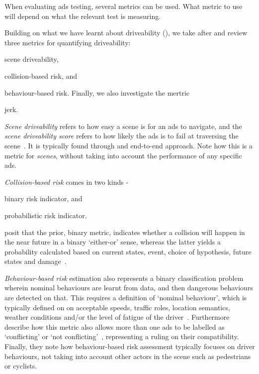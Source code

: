 When evaluating \acrshort{ads} testing, several metrics can be used. What metric to use will depend
on what the relevant test is measuring.

Building on what we have learnt about driveability (),
we take after \citeauthor{safeToDrive} and review three metrics for
quantifying driveability: \begin{inparaenum}
    \item scene driveability,
    \item collision-based risk, and
    \item behaviour-based risk. Finally, we also investigate the mertric
    \item jerk.
\end{inparaenum}

\emph{Scene driveability} refers to how easy a scene is for an
\acrshort{ads} to navigate, and the \textit{scene driveability score} refers to
how likely the \acrlong{ads} is to fail at traversing the
scene~\cite[3140]{safeToDrive}. It is typically found through and end-to-end
approach. Note how this is a metric for \textit{scenes}, without taking into
account the performance of any specific \acrshort{ads}.

\emph{Collision-based risk} comes in two kinds - \begin{inparaenum}
    \item binary risk indicator, and
    \item probabilistic risk indicator.
\end{inparaenum} \citeauthor{safeToDrive} posit that the prior, binary metric, indicates whether a
collision will happen in the near future in a binary `either-or' sense, whereas the latter yields a
probability calculated based on current states, event, choice of hypothesis, future states and
damage~\cite[3140]{safeToDrive}.

\emph{Behaviour-based risk} estimation also represents a binary classification problem wherein
nominal behaviours are learnt from data, and then dangerous behaviours are detected on that. This
requires a definition of `nominal behaviour', which is typically defined on on acceptable speeds,
traffic roles, location semantics, weather conditions and/or the level of fatigue of the
driver~\cite[3140]{safeToDrive}. Furthermore \citeauthor{safeToDrive} describe how this metric also
allows more than one \acrshort{ads} to be labelled as `conflicting' or `not
conflicting'~\cite[3140]{safeToDrive}, representing a ruling on their compatibility. Finally, they
note how behaviour-based risk assessment typically focuses on driver behaviours, not taking into
account other actors in the scene such as pedestrians or cyclists.

